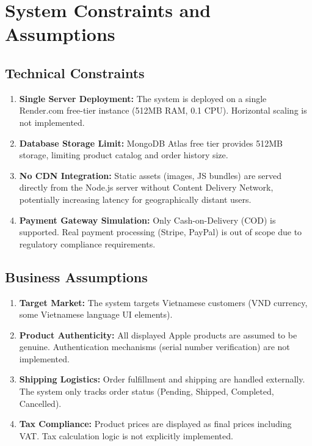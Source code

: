 \documentclass[12pt, a4paper]{report}
\begin{document}
\section{System Constraints and Assumptions}

\subsection{Technical Constraints}

\begin{enumerate}
    \item \textbf{Single Server Deployment:} The system is deployed on a single Render.com free-tier instance (512MB RAM, 0.1 CPU). Horizontal scaling is not implemented.
    
    \item \textbf{Database Storage Limit:} MongoDB Atlas free tier provides 512MB storage, limiting product catalog and order history size.
    
    \item \textbf{No CDN Integration:} Static assets (images, JS bundles) are served directly from the Node.js server without Content Delivery Network, potentially increasing latency for geographically distant users.
    
    \item \textbf{Payment Gateway Simulation:} Only Cash-on-Delivery (COD) is supported. Real payment processing (Stripe, PayPal) is out of scope due to regulatory compliance requirements.
\end{enumerate}

\subsection{Business Assumptions}

\begin{enumerate}
    \item \textbf{Target Market:} The system targets Vietnamese customers (VND currency, some Vietnamese language UI elements).
    
    \item \textbf{Product Authenticity:} All displayed Apple products are assumed to be genuine. Authentication mechanisms (serial number verification) are not implemented.
    
    \item \textbf{Shipping Logistics:} Order fulfillment and shipping are handled externally. The system only tracks order status (Pending, Shipped, Completed, Cancelled).
    
    \item \textbf{Tax Compliance:} Product prices are displayed as final prices including VAT. Tax calculation logic is not explicitly implemented.
\end{enumerate}
\end{document}
